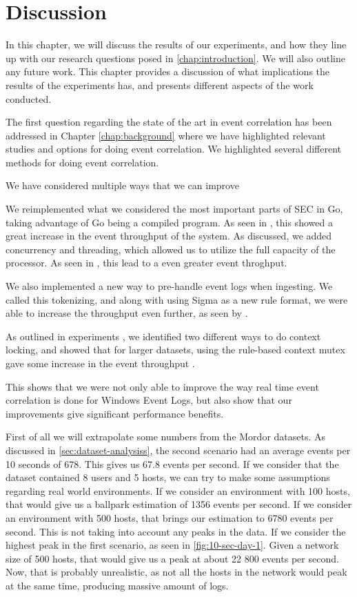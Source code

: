 \chapter{Discussion}
\label{chap:discussion}

In this chapter, we will discuss the results of our experiments, and how they line up with our research questions posed in \cref{chap:introduction}. We will also outline any future work.
This chapter provides a discussion of what implications the results of the experiments has, and presents different aspects of the work conducted.


The first question regarding the state of the art in event correlation has been addressed in Chapter \cref{chap:background} where we have highlighted relevant studies and options for doing event correlation. We highlighted several different methods for doing event correlation.

We have considered multiple ways that we can improve 

We reimplemented what we considered the most important parts of \acrshort{SEC} in Go, taking advantage of Go being a compiled program. As seen in , this showed a great increase in the event throughput of the system. As discussed, we added concurrency and threading, which allowed us to utilize the full capacity of the processor. As seen in  , this lead to a even greater event throghput.

We also implemented a new way to pre-handle event logs when ingesting. We called this tokenizing,   and along with using Sigma  as a new rule format, we were able to increase the throughput even further, as seen by  .

As outlined in experiments  , we identified two different ways to do context locking, and showed that for larger datasets, using the rule-based context mutex gave some increase in the event throughput  .

This shows that we were not only able to improve the way real time event correlation is done for Windows Event Logs, but also show that our improvements give significant performance benefits.

First of all we will extrapolate some numbers from the Mordor datasets. As discussed in \cref{sec:dataset-analysiss}, the second scenario had an average events per 10 seconds of 678. This gives us 67.8 events per second. If we consider that the dataset contained 8 users and 5 hosts, we can try to make some assumptions regarding real world environments. If we consider an environment with 100 hosts, that would give us a ballpark estimation of 1356 events per second. If we consider an environment with 500 hosts, that brings our estimation to 6780 events per second. This is not taking into account any peaks in the data. If we consider the highest peak in the first scenario, as seen in \cref{fig:10-sec-day-1}. Given a network size of 500 hosts, that would give us a peak at about 22 800 events per second. Now, that is probably unrealistic, as not all the hosts in the network would peak at the same time, producing massive amount of logs.

